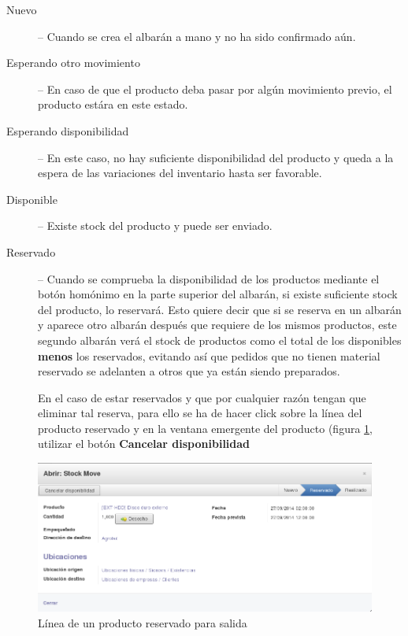 \begin{description}
  \item[Nuevo] -- Cuando se crea el albarán a mano y no ha sido confirmado aún.
  
  \item[Esperando otro movimiento] -- En caso de que el producto deba pasar por algún movimiento previo, el producto estára en este estado.

  \item[Esperando disponibilidad] -- En este caso, no hay suficiente disponibilidad del producto y queda a la espera de las variaciones del inventario hasta ser favorable.

  \item[Disponible] -- Existe stock del producto y puede ser enviado.

  \item[Reservado] -- Cuando se comprueba la disponibilidad de los productos mediante el botón homónimo en la parte superior del albarán, si existe suficiente stock del producto, lo reservará. Esto quiere decir que si se reserva en un albarán y aparece otro albarán después que requiere de los mismos productos, este segundo albarán verá el stock de productos como el total de los disponibles \textbf{menos} los reservados, evitando así que pedidos que no tienen material reservado se adelanten a otros que ya están siendo preparados.

En el caso de estar reservados y que por cualquier razón tengan que eliminar tal reserva, para ello se ha de hacer click sobre la línea del producto reservado y en la ventana emergente del producto (figura \ref{al:prodreser}, utilizar el botón \textbf{Cancelar disponibilidad}
\end{description}

\begin{figure}[H]
\includegraphics[width=\textwidth]{almacen/img/alb_salida_res.png}
\caption{Línea de un producto reservado para salida}
\label{al:prodreser}
\end{figure}

